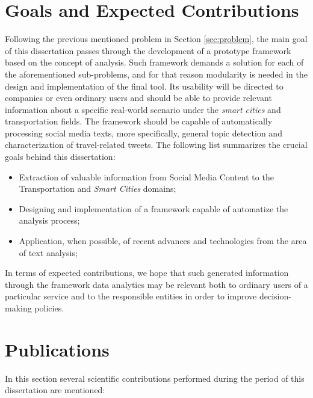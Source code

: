 \section{Goals and Expected Contributions}\label{sec:contributions}
Following the previous mentioned problem in Section \ref{sec:problem}, the main goal of this dissertation passes through the development of a prototype framework based on the concept of analysis. Such framework demands a solution for each of the aforementioned sub-problems, and for that reason modularity is needed in the design and implementation of the final tool. Its usability will be directed to companies or even ordinary users and should be able to provide relevant information about a specific real-world scenario under the \textit{smart cities} and transportation fields. The framework should be capable of automatically processing social media texts, more specifically, general topic detection and characterization of travel-related tweets. The following list summarizes the crucial goals behind this dissertation:

\begin{itemize}
	\item Extraction of valuable information from Social Media Content to the Transportation and \textit{Smart Cities} domains;
	\item Designing and implementation of a framework capable of automatize the analysis process;
	\item Application, when possible, of recent advances and technologies from the area of text analysis;
\end{itemize}

\medskip

In terms of expected contributions, we hope that such generated information through the framework data analytics may be relevant both to ordinary users of a particular service and to the responsible entities in order to improve decision-making policies.

\section{Publications}\label{sec:publications}
In this section several scientific contributions performed during the period of this dissertation are mentioned:

